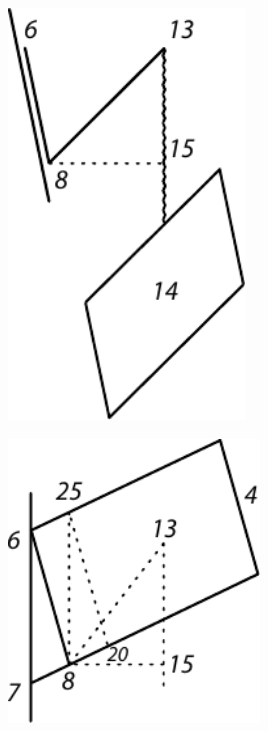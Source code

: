 %
%
\pstart 
\begin{minipage}[t]{0.5\textwidth}
\hspace{4mm}\includegraphics[width=0.47\textwidth]{gesamttex/edit_VIII,3/images/LH_37_03_069-070_d09.pdf}
\end{minipage}
\hspace{7mm}
\begin{minipage}[t]{0.5\textwidth}
\includegraphics[width=0.5\textwidth]{gesamttex/edit_VIII,3/images/LH_37_03_069-070_d10.pdf}
\end{minipage}
